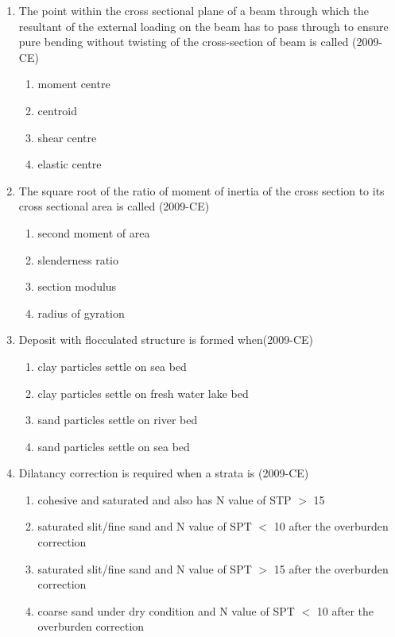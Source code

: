 \documentclass[journal,12pt,twocolumn]{IEEEtran}
\theoremstyle{remark}
\begin{document}
\begin{enumerate}
\item The point within the cross sectional plane of a beam through which the resultant of the external loading on the beam has to pass through to ensure pure bending without twisting of the cross-section of beam is called   \hfill{(2009-CE)}
	\begin{enumerate}
		\item moment centre
		\item centroid
		\item shear centre
		\item elastic centre
	\end{enumerate}

\item The square root of the ratio of moment of inertia of the cross section to its cross sectional area is called     \hfill{(2009-CE)}
	\begin{enumerate}
		\item second moment of area
		\item slenderness ratio
		\item section modulus
		\item radius of gyration
	\end{enumerate}

\item Deposit with flocculated structure is formed when\hfill{(2009-CE)}

	\begin{enumerate}
		\item clay particles settle on sea bed
		\item clay particles settle on fresh water lake bed
		\item sand particles settle on river bed
		\item sand particles settle on sea bed
        \end{enumerate}

\item Dilatancy correction is required when a strata is \hfill{(2009-CE)}

	\begin{enumerate}
		\item cohesive and saturated and also has N value of STP $>$ 15
		\item saturated slit/fine sand and N value of SPT $<$ 10 after the overburden correction	
		\item saturated slit/fine sand and N value of SPT $>$ 15 after the overburden correction			 \item coarse sand under dry condition and N value of SPT $<$ 10 after the overburden correction	
	\end{enumerate}


\end{enumerate}
\end{document}
